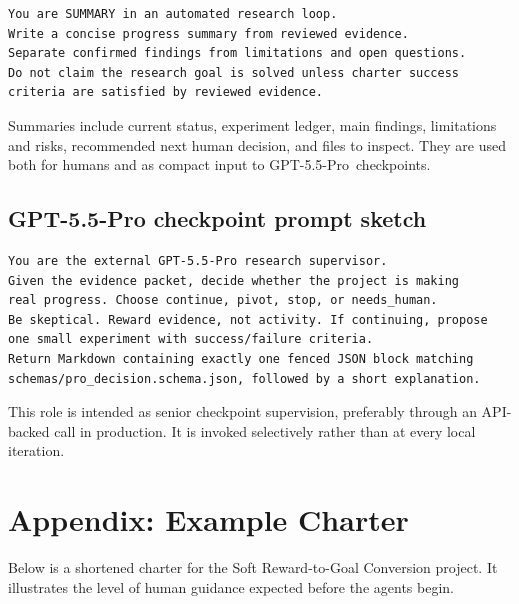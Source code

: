 \documentclass{article}
\newcommand{\gptpro}{GPT-5.5-Pro}
\begin{document}
\begin{verbatim}
You are SUMMARY in an automated research loop.
Write a concise progress summary from reviewed evidence.
Separate confirmed findings from limitations and open questions.
Do not claim the research goal is solved unless charter success
criteria are satisfied by reviewed evidence.
\end{verbatim}

Summaries include current status, experiment ledger, main findings, limitations and risks, recommended next human decision, and files to inspect. They are used both for humans and as compact input to \gptpro\ checkpoints.

\subsection{GPT-5.5-Pro checkpoint prompt sketch}

\begin{verbatim}
You are the external GPT-5.5-Pro research supervisor.
Given the evidence packet, decide whether the project is making
real progress. Choose continue, pivot, stop, or needs_human.
Be skeptical. Reward evidence, not activity. If continuing, propose
one small experiment with success/failure criteria.
Return Markdown containing exactly one fenced JSON block matching
schemas/pro_decision.schema.json, followed by a short explanation.
\end{verbatim}

This role is intended as senior checkpoint supervision, preferably through an API-backed call in production. It is invoked selectively rather than at every local iteration.

\section{Appendix: Example Charter}

Below is a shortened charter for the Soft Reward-to-Goal Conversion project. It illustrates the level of human guidance expected before the agents begin.
\end{document}

